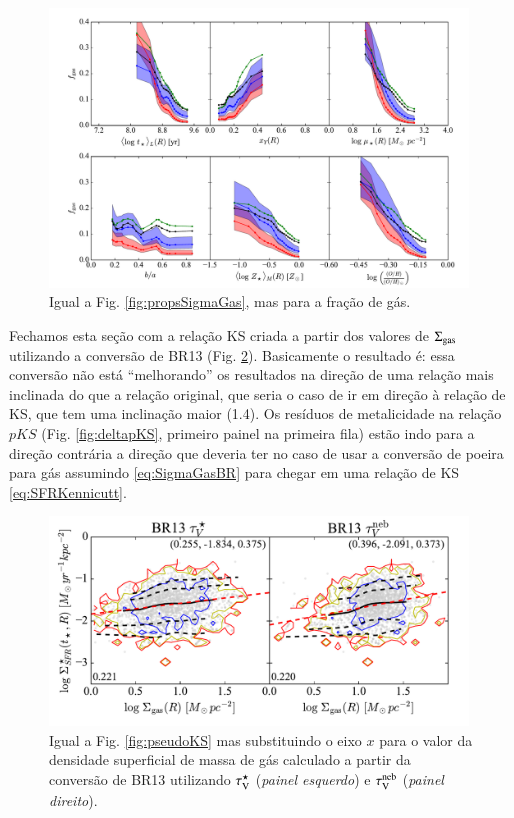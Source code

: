 \begin{figure}
	\centering
 	\includegraphics[width=0.99\textwidth]{figuras/props_fGas.pdf}
 	\caption[Propriedades físicas e $f_{\mathrm{gas}}$.]
 	{Igual a Fig. \ref{fig:propsSigmaGas}, mas para a fração de gás.}
 	\label{fig:propsfGas}
\end{figure} 

Fechamos esta seção com a relação KS criada a partir dos valores de $\Sigma_{\mathrm{gas}}$ utilizando a
conversão de BR13 (Fig. \ref{fig:KS}). Basicamente o resultado é: essa conversão não está
``melhorando'' os resultados na direção de uma relação mais inclinada do que a relação original, que
seria o caso de ir em direção à relação de KS, que tem uma inclinação maior (1.4). Os resíduos de
metalicidade na relação $pKS$ (Fig. \ref{fig:deltapKS}, primeiro painel na primeira fila) estão indo
para a direção contrária a direção que deveria ter no caso de usar a conversão de poeira para gás
assumindo \eqref{eq:SigmaGasBR} para chegar em uma relação de KS \eqref{eq:SFRKennicutt}.

\begin{figure}
	\centering
	\includegraphics[width=0.99\textwidth]{figuras/KS.pdf}
	\caption[Relação de Kennicut-Schmidt.]
	{Igual a Fig. \ref{fig:pseudoKS} mas substituindo o eixo $x$ para o valor da densidade superficial
de massa de gás calculado a partir da conversão de BR13 utilizando $\tau_{\mathrm{V}}^\star$ ({\em painel esquerdo})
e $\tau_{\mathrm{V}}^{\mathrm{neb}}$ ({\em painel direito}).}
	\label{fig:KS}
\end{figure}

